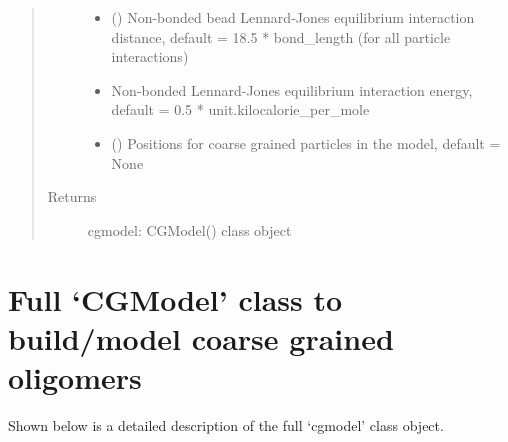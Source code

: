 \documentclass[letterpaper,12pt,english,openany,oneside]{sphinxmanual}
\begin{document}
\begin{fulllineitems}
\begin{quote}
\begin{description}
\begin{itemize}
\item {} 
 () \textendash{} Non-bonded bead Lennard-Jones equilibrium interaction distance, default = 18.5 * bond\_length (for all particle interactions)

\item {} 
 \textendash{} Non-bonded Lennard-Jones equilibrium interaction energy, default = 0.5 * unit.kilocalorie\_per\_mole

\item {} 
 (\sphinxstyleliteralemphasis{\sphinxupquote{( }}\sphinxstyleliteralemphasis{\sphinxupquote{ ( }}\sphinxstyleliteralemphasis{\sphinxupquote{ ) }}\sphinxstyleliteralemphasis{\sphinxupquote{)}}) \textendash{} Positions for coarse grained particles in the model, default = None

\end{itemize}

\item[{Returns}] \leavevmode
cgmodel: CGModel() class object

\end{description}\end{quote}

\end{fulllineitems}



\section{Full ‘CGModel’ class to build/model coarse grained oligomers}
\label{\detokenize{cg_model:full-cgmodel-class-to-build-model-coarse-grained-oligomers}}
Shown below is a detailed description of the full ‘cgmodel’ class object.

\label{\detokenize{cg_model:module-cg_model.cgmodel}}
\end{document}
